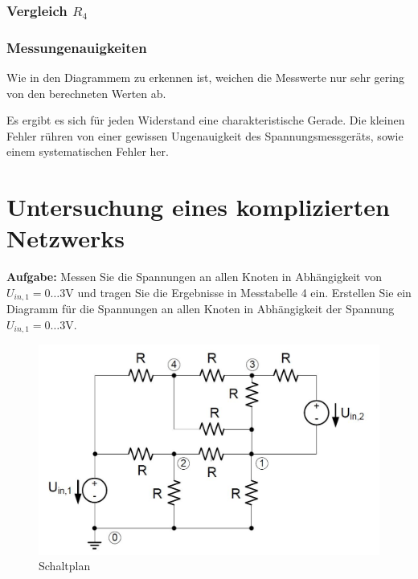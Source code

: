 \documentclass[10pt]{report}
\begin{document}
        \subsubsection{Vergleich $R_4$}
        \begin{center}
        \end{center}


        \subsubsection{Messungenauigkeiten}
        Wie in den Diagrammem zu erkennen ist, weichen die Messwerte nur sehr
        gering von den berechneten Werten ab.

        Es ergibt es sich für jeden Widerstand eine charakteristische Gerade.
		Die kleinen Fehler rühren von einer gewissen Ungenauigkeit des Spannungsmessgeräts,
		sowie einem systematischen Fehler her.

        \section{Untersuchung eines komplizierten Netzwerks}
        \textbf{Aufgabe:} Messen Sie die Spannungen an allen
        Knoten in Abhängigkeit von $U_{in,1} = 0 \ldots 3 \si{\volt}$ und tragen Sie die Ergebnisse in Messtabelle
        4 ein. Erstellen Sie ein Diagramm für die Spannungen an allen Knoten in Abhängigkeit
        der Spannung $U_{in,1} = 0 \ldots 3 \si{\volt}$.

        \begin{center}
            \begin{figure}[H]
                \includegraphics[width=\textwidth]{KomplexesNetzwerk.JPG}
              \caption{Schaltplan}
            \end{figure}
        \end{center}
\end{document}

